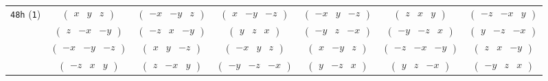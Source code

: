 \documentclass[fleqn,9pt,landscape]{jsarticle}
\begin{document}
\begin{center}
\begin{longtable}{ccccccc}
{\tt 48h} ({\tt 1}) & $ \begin{pmatrix} x & y & z \end{pmatrix} $ & $ \begin{pmatrix} - x & - y & z \end{pmatrix} $ & $ \begin{pmatrix} x & - y & - z \end{pmatrix} $ & $ \begin{pmatrix} - x & y & - z \end{pmatrix} $ & $ \begin{pmatrix} z & x & y \end{pmatrix} $ & $ \begin{pmatrix} - z & - x & y \end{pmatrix} $ \\
& $ \begin{pmatrix} z & - x & - y \end{pmatrix} $ & $ \begin{pmatrix} - z & x & - y \end{pmatrix} $ & $ \begin{pmatrix} y & z & x \end{pmatrix} $ & $ \begin{pmatrix} - y & z & - x \end{pmatrix} $ & $ \begin{pmatrix} - y & - z & x \end{pmatrix} $ & $ \begin{pmatrix} y & - z & - x \end{pmatrix} $ \\
& $ \begin{pmatrix} - x & - y & - z \end{pmatrix} $ & $ \begin{pmatrix} x & y & - z \end{pmatrix} $ & $ \begin{pmatrix} - x & y & z \end{pmatrix} $ & $ \begin{pmatrix} x & - y & z \end{pmatrix} $ & $ \begin{pmatrix} - z & - x & - y \end{pmatrix} $ & $ \begin{pmatrix} z & x & - y \end{pmatrix} $ \\
& $ \begin{pmatrix} - z & x & y \end{pmatrix} $ & $ \begin{pmatrix} z & - x & y \end{pmatrix} $ & $ \begin{pmatrix} - y & - z & - x \end{pmatrix} $ & $ \begin{pmatrix} y & - z & x \end{pmatrix} $ & $ \begin{pmatrix} y & z & - x \end{pmatrix} $ & $ \begin{pmatrix} - y & z & x \end{pmatrix} $ \\

\end{longtable}
\end{center}
\end{document}
